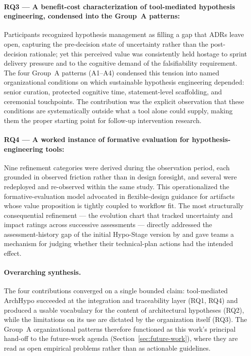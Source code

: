 \paragraph{RQ3 --- A benefit-cost characterization of tool-mediated hypothesis
engineering, condensed into the Group~A patterns:} Participants recognized
hypothesis management as filling a gap that ADRs leave open, capturing the
pre-decision state of uncertainty rather than the post-decision rationale; yet
this perceived value was consistently held hostage to sprint delivery pressure
and to the cognitive demand of the falsifiability requirement. The four
Group~A patterns (A1--A4) condensed this tension into named organizational
conditions on which sustainable hypothesis engineering depended: senior
curation, protected cognitive time, statement-level scaffolding, and
ceremonial touchpoints. The contribution was the explicit observation that
these conditions are systematically outside what a tool alone could supply,
making them the proper starting point for follow-up intervention research.

\paragraph{RQ4 --- A worked instance of formative evaluation for
hypothesis-engineering tools:} Nine refinement categories were derived during
the observation period, each grounded in observed friction rather than in
design foresight, and several were redeployed and re-observed within the same
study. This operationalized the formative-evaluation model advocated in
flexible-design guidance \citep{robson2016} for artifacts whose value
proposition is tightly coupled to workflow fit. The most structurally
consequential refinement --- the evolution chart that tracked uncertainty and
impact ratings across successive assessments --- directly addressed the
assessment-history gap of the initial Hypo-Stage version by \citet{correa2025}
and gave teams a mechanism for judging whether their technical-plan actions
had the intended effect.

\paragraph{Overarching synthesis.} The four contributions converged on a
single bounded claim: tool-mediated ArchHypo succeeded at the integration and
traceability layer (RQ1, RQ4) and produced a usable vocabulary for the
content of architectural hypotheses (RQ2), while the limitations on its use are 
dictated by the organization itself (RQ3). The Group~A organizational patterns therefore
functioned as this work's principal hand-off to the future-work agenda
(Section~\ref{sec:future-work}), where they are read as open empirical
problems rather than as actionable guidelines.


